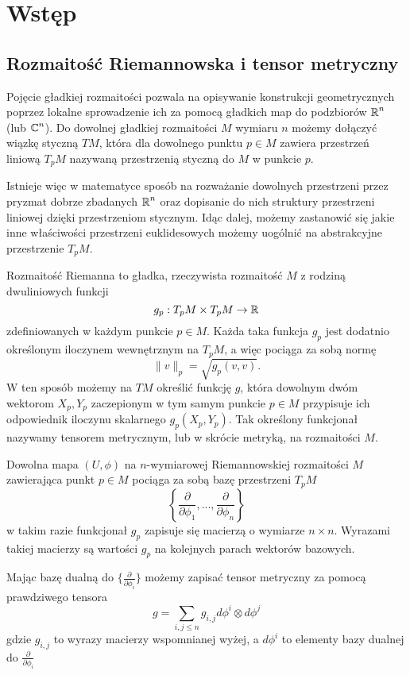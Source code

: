 \section{Wstęp}

\subsection{Rozmaitość Riemannowska i tensor metryczny}

Pojęcie gładkiej rozmaitości pozwala na opisywanie konstrukcji geometrycznych poprzez lokalne sprowadzenie ich za pomocą gładkich map do podzbiorów $\operatorname{\mathbb{R}}^n$ (lub $\operatorname{\mathbb{C}}^n$). Do dowolnej gładkiej rozmaitości $M$ wymiaru $n$ możemy dołączyć wiązkę styczną $TM$, która dla dowolnego punktu $p\in M$ zawiera przestrzeń liniową $T_pM$ nazywaną przestrzenią styczną do $M$ w punkcie $p$. 

Istnieje więc w matematyce sposób na rozważanie dowolnych przestrzeni przez pryzmat dobrze zbadanych $\operatorname{\mathbb{R}}^n$ oraz dopisanie do nich struktury przestrzeni liniowej dzięki przestrzeniom stycznym. Idąc dalej, możemy zastanowić się jakie inne właściwości przestrzeni euklidesowych możemy uogólnić na abstrakcyjne przestrzenie $T_pM$.

Rozmaitość Riemanna to gładka, rzeczywista rozmaitość $M$ z rodziną dwuliniowych funkcji 
$$g_p:T_pM\times T_pM\to \operatorname{\mathbb{R}}$$ 
zdefiniowanych w każdym punkcie $p\in M$. Każda taka funkcja $g_p$ jest dodatnio określonym iloczynem wewnętrznym na $T_pM$, a więc pociąga za sobą normę 
$$\|v\|_p=\sqrt{g_p(v, v)}.$$
W ten sposób możemy na $TM$ określić funkcję $g$, która dowolnym dwóm wektorom $X_p,Y_p$ zaczepionym w tym samym punkcie $p\in M$ przypisuje ich odpowiednik iloczynu skalarnego $g_p(X_p,Y_p)$. Tak określony funkcjonał nazywamy tensorem metrycznym, lub w skrócie metryką, na rozmaitości $M$.

Dowolna mapa $(U,\phi)$ na $n$-wymiarowej Riemannowskiej rozmaitości $M$ zawierająca punkt $p\in M$ pociąga za sobą bazę przestrzeni $T_pM$
$$\left\{ \frac{\partial}{\partial\phi_1} , ... , \frac{\partial}{\partial\phi_n} \right\}$$
w takim razie funkcjonał $g_p$ zapisuje się macierzą o wymiarze $n\times n$. Wyrazami takiej macierzy są wartości $g_p$ na kolejnych parach wektorów bazowych.

Mając bazę dualną do $\{\frac{\partial}{\partial\phi_i}\}$ możemy zapisać tensor metryczny za pomocą prawdziwego tensora
$$g=\sum_{i,j\leq n}g_{i,j}d\phi^i\otimes d\phi^j$$
gdzie $g_{i,j}$ to wyrazy macierzy wspomnianej wyżej, a $d\phi^i$ to elementy bazy dualnej do $\frac{\partial}{\partial\phi_i}$


